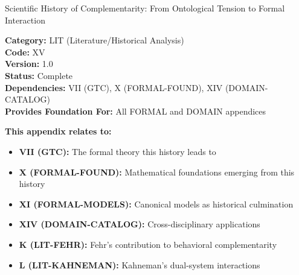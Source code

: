 
\begin{chapter}{Scientific History of Complementarity: From Ontological Tension to Formal Interaction}
\label{app:lit-history}

\begin{tcolorbox}[colback=gray!5!white,colframe=gray!75!black]
\small
\textbf{Category:} LIT (Literature/Historical Analysis) \\
\textbf{Code:} XV \\
\textbf{Version:} 1.0 \\
\textbf{Status:} Complete \\
\textbf{Dependencies:} VII (GTC), X (FORMAL-FOUND), XIV (DOMAIN-CATALOG) \\
\textbf{Provides Foundation For:} All FORMAL and DOMAIN appendices
\end{tcolorbox}

\begin{tcolorbox}[colback=blue!5!white,colframe=blue!75!black,title=\textbf{Cross-Reference Map}]
\small
\textbf{This appendix relates to:}
\begin{itemize}[noitemsep]
    \item \textbf{VII (GTC):} The formal theory this history leads to
    \item \textbf{X (FORMAL-FOUND):} Mathematical foundations emerging from this history
    \item \textbf{XI (FORMAL-MODELS):} Canonical models as historical culmination
    \item \textbf{XIV (DOMAIN-CATALOG):} Cross-disciplinary applications
    \item \textbf{K (LIT-FEHR):} Fehr's contribution to behavioral complementarity
    \item \textbf{L (LIT-KAHNEMAN):} Kahneman's dual-system interactions
\end{itemize}
\end{tcolorbox}


\end{chapter}
